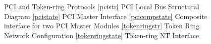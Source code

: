\begin{figure}[tb]
\hspace{0.15in}
\subfigure[]{\label{tokenringstate}
}

\caption{PCI and Token-ring Protocols 
\ref{pcistr} PCI Local Bus Structural Diagram
\ref{pcistate} PCI Master Interface
\ref{pcicompstate} Composite interface for two PCI Master Modules
\ref{tokenringstr} Token Ring Network Configuration
\ref{tokenringstate} Token-ring NT Interface
} 
\end{figure}

